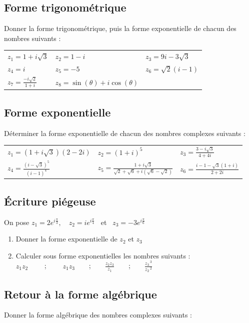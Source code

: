\documentclass[oneside,12pt]{article}          %
\begin{document}
\subsection{Forme trigonométrique}
Donner la forme trigonométrique, puis la forme exponentielle de chacun des nombres suivants :\\
\begin{tabular}{p{} p{} p{}}
    $z_1=1+i\sqrt{3}$ & $z_2=1-i$ & $z_3= 9i-3\sqrt{3}$ \\
    $z_4=i$ & $z_5=-5$ & $z_6=\sqrt{2}(i-1)$ \\
    $z_7=\frac{-i\sqrt{2}}{1+i}$ & $z_8=\sin(\theta)+i\cos(\theta)$ 
\end{tabular}



\subsection{Forme exponentielle}
Déterminer la forme exponentielle de chacun des nombres complexes suivants : \\
\renewcommand{\arraystretch}{1.7}
\begin{tabular}{p{} p{} p{}}
    $z_1=(1+i\sqrt{3})(2-2i)$ & $z_2=(1+i)^5$ & $z_3=\frac{3-i\sqrt{3}}{4+4i}$ \\
    $z_4=\frac{(i-\sqrt{3})^5}{(i-1)^4}$ & $z_5=\frac{1+i\sqrt{3}}{\sqrt{2}+\sqrt{6}+i(\sqrt{6}-\sqrt{2})}$ & $z_6=\frac{i-1-\sqrt{3}(1+i)}{2+2i}$
\end{tabular}




\subsection{Écriture piégeuse}
On pose $z_1=2e^{i\frac{\pi}{3}}, \quad z_2=ie^{i\frac{\pi}{4}}$ \, et \, $z_3=-3e^{i\frac{\pi}{6}}$
\begin{enumerate}
	\item Donner la forme exponentielle de $z_2$ et $z_3$
	\item Calculer sous forme exponentielles les nombres suivants : \\
        $z_1z_2$ ~~~~;~~~~ $z_1z_3$~~~~;~~~~$\frac{z_2z_3}{z_1}$~~~~;~~~~$\frac{z_3\,^3}{z_2\,^2}$
\end{enumerate}



\subsection{Retour à la forme algébrique}
Donner la forme algébrique des nombres complexes suivants :
\end{document}
